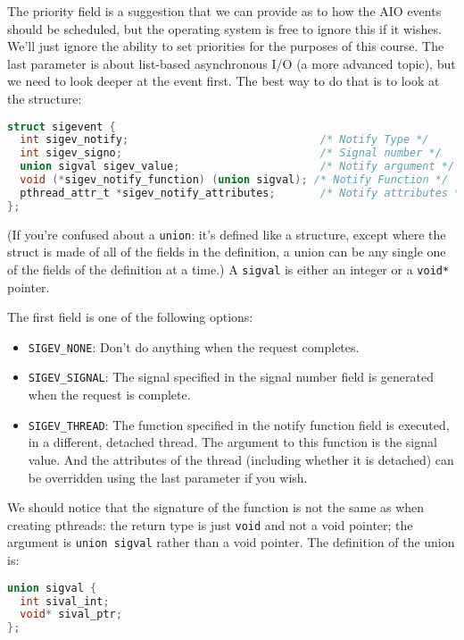 The priority field is a suggestion that we can provide as to how the AIO events should be scheduled, but the operating system is free to ignore this if it wishes. We'll just ignore the ability to set priorities for the purposes of this course. The last parameter is about list-based asynchronous I/O (a more advanced topic), but we need to look deeper at the event first. The best way to do that is to look at the structure:

\begin{lstlisting}[language=C]
struct sigevent {
  int sigev_notify;                              /* Notify Type */
  int sigev_signo;                               /* Signal number */
  union sigval sigev_value;                      /* Notify argument */
  void (*sigev_notify_function) (union sigval); /* Notify Function */
  pthread_attr_t *sigev_notify_attributes;       /* Notify attributes */
};
\end{lstlisting}

(If you're confused about a \texttt{union}: it's defined like a structure, except where the struct is made of all of the fields in the definition, a union can be any single one of the fields of the definition at a time.) A \texttt{sigval} is either an integer or a \texttt{void*} pointer.

The first field is one of the following options:
\begin{itemize}
	\item \texttt{SIGEV\_NONE}: Don't do anything when the request completes.
	\item \texttt{SIGEV\_SIGNAL}: The signal specified in the signal number field is generated when the request is complete.
	\item \texttt{SIGEV\_THREAD}: The function specified in the notify function field is executed, in a different, detached thread. The argument to this function is the signal value. And the attributes of the thread (including whether it is detached) can be overridden using the last parameter if you wish.
\end{itemize}

We should notice that the signature of the function is not the same as when creating pthreads: the return type is just \texttt{void} and not a void pointer; the argument is \texttt{union sigval} rather than a void pointer. The definition of the union is:

\begin{lstlisting}[language=C]
union sigval {
  int sival_int;
  void* sival_ptr;
};
\end{lstlisting}


